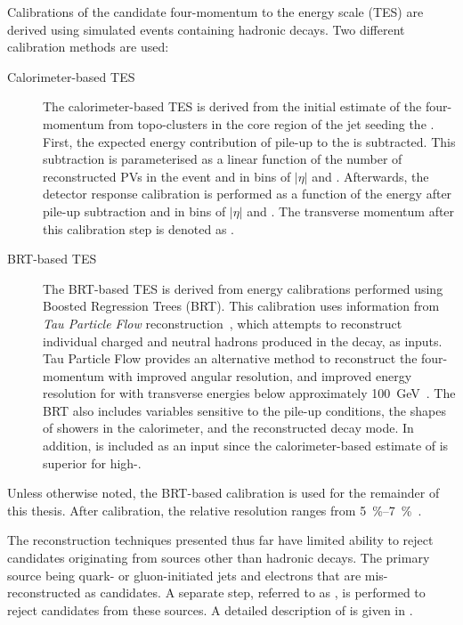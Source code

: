 Calibrations of the \tauhadvis candidate four-momentum to the \tauhadvis energy
scale (TES) are derived using simulated events containing hadronic \taulepton
decays. Two different calibration methods are used:
\begin{description}

\item[Calorimeter-based TES] The calorimeter-based TES is derived from the
  initial estimate of the \tauhadvis four-momentum from topo-clusters in the
  core region of the jet seeding the \tauhadvis. First, the expected energy
  contribution of pile-up to the \tauhadvis is subtracted. This subtraction is
  parameterised as a linear function of the number of reconstructed PVs in the
  event and in bins of \tauhadvis $|\eta|$ and \Ntracks. Afterwards, the
  detector response calibration is performed as a function of the \tauhadvis
  energy after pile-up subtraction and in bins of \tauhadvis $|\eta|$ and
  \Ntracks. The \tauhadvis transverse momentum after this calibration step is
  denoted as \pTLC.

\item[BRT-based TES] The BRT-based TES is derived from \tauhadvis energy
  calibrations performed using Boosted Regression Trees (BRT). This calibration
  uses information from \emph{Tau Particle Flow}
  reconstruction~\cite{PERF-2014-06}, which attempts to reconstruct individual
  charged and neutral hadrons produced in the \taulepton decay, as inputs. Tau
  Particle Flow provides an alternative method to reconstruct the \tauhadvis
  four-momentum with improved angular resolution, and improved energy resolution
  for \tauhadvis with transverse energies below approximately
  \SI{100}{\GeV}~\cite{PERF-2014-06}. The BRT also includes variables sensitive
  to the pile-up conditions, the shapes of showers in the calorimeter, and the
  reconstructed \taulepton decay mode. In addition, \pTLC is included as an
  input since the calorimeter-based estimate of \tauhadvis \pT is superior for
  high-\pT \tauhadvis.

\end{description}
Unless otherwise noted, the BRT-based calibration is used for the remainder of
this thesis. After calibration, the relative \tauhadvis \pT resolution ranges
from \SIrange{5}{7}{\percent}~\cite{ATLAS-CONF-2017-029}.

The \tauhadvis reconstruction techniques presented thus far have limited ability
to reject \tauhadvis candidates originating from sources other than hadronic
\taulepton decays. The primary source being quark- or gluon-initiated jets and
electrons that are mis-reconstructed as \tauhadvis candidates. A separate step,
referred to as \tauid, is performed to reject \tauhadvis candidates from these
sources. A detailed description of \tauid is given in .



